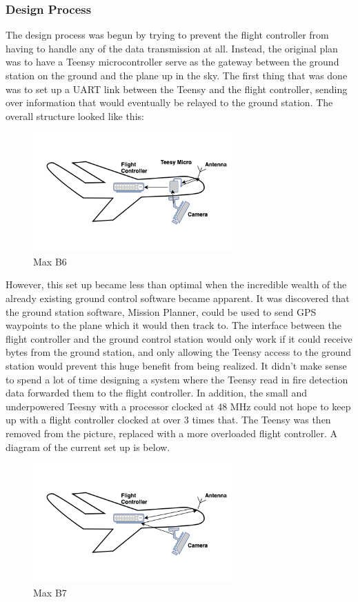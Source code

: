 \documentclass[12pt,journal,compsoc]{IEEEtran}
\begin{document}
\subsubsection{Design Process}
The design process was begun by trying to prevent the flight controller from having to handle any of the data transmission at all. Instead, the original plan was to have a Teensy microcontroller serve as the gateway between the ground station on the ground and the plane up in the sky. The first thing that was done was to set up a UART link between the Teensy and the flight controller, sending over information that would eventually be relayed to the ground station. The overall structure looked like this:
\begin{figure}[h!]
\hspace*{0cm}
\centering
\includegraphics[width=3in]{Version1.png}
\caption{Max B6}
\label{version1}
\end{figure}

However, this set up became less than optimal when the incredible wealth of the already existing ground control software became apparent. It was discovered that the ground station software, Mission Planner, could be used to send GPS waypoints to the plane which it would then track to. The interface between the flight controller and the ground control station would only work if it could receive bytes from the ground station, and only allowing the Teensy access to the ground station would prevent this huge benefit from being realized. 
It didn't make sense to spend a lot of time designing a system where the Teensy read in fire detection data forwarded them to the flight controller. In addition, the small and underpowered Teesny with a processor clocked at 48 MHz could not hope to keep up with a flight controller clocked at over 3 times that. The Teensy was then removed from the picture, replaced with a more overloaded flight controller. A diagram of the current set up is below.
\begin{figure}[h!]
\hspace*{0cm}
\centering
\includegraphics[width=3in]{Version2.png}
\caption{Max B7}
\label{version2}
\end{figure}
\end{document}
